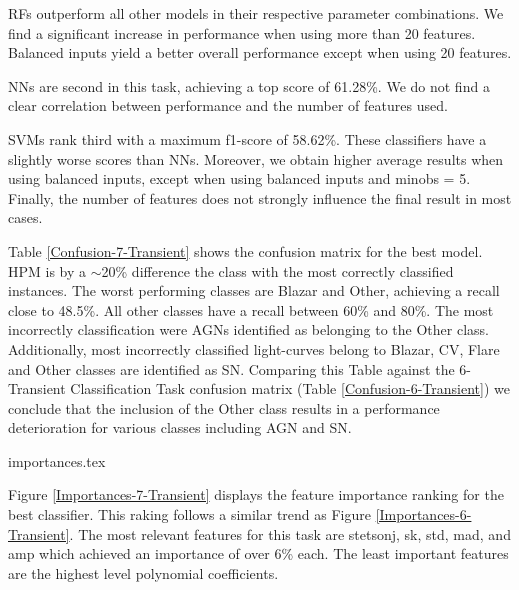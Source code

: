 \documentclass[a4paper,fleqn,usenatbib]{mnras}
\begin{document}
RFs outperform all other models in their respective parameter
combinations. 
We find a significant increase in performance when using more than 20
features. 
Balanced inputs yield a better overall performance except when using 20 
features. 

NNs are second in this task, achieving a top score of 61.28\%.  
We do not find a clear correlation between performance and the number
of features used. 


SVMs rank third with a maximum f1-score of 58.62\%. 
These classifiers have a slightly worse scores than NNs.
Moreover, we obtain higher average results when using balanced inputs,
except when using balanced inputs and min\textunderscore obs = 5.
Finally, the number of features does not strongly influence the final
result in most cases.

Table \ref{Confusion-7-Transient} shows the confusion matrix for the
best model. 
HPM is by a $\sim$20\% difference the class with the most correctly
classified instances.  
The worst performing classes are Blazar and Other, achieving a recall
close to 48.5\%. 
All other classes have a recall between 60\% and 80\%. 
The most incorrectly classification were AGNs identified as belonging
to the Other class. 
Additionally, most incorrectly classified light-curves belong to Blazar, CV, Flare and
Other classes are identified as SN. 
Comparing this Table against the  6-Transient Classification Task confusion matrix (Table
\ref{Confusion-6-Transient}) we conclude that the inclusion of the
Other class results in a performance deterioration for various classes
including AGN and SN.   



{importances.tex}

Figure \ref{Importances-7-Transient} displays the feature importance
ranking for the best classifier.
This raking follows a similar trend as Figure \ref{Importances-6-Transient}. 
The most relevant features for this task are stetson\textunderscore j,
sk, std, mad, and amp which achieved an importance of over 6\% each. 
The least important features are the highest level polynomial
coefficients.
\end{document}
